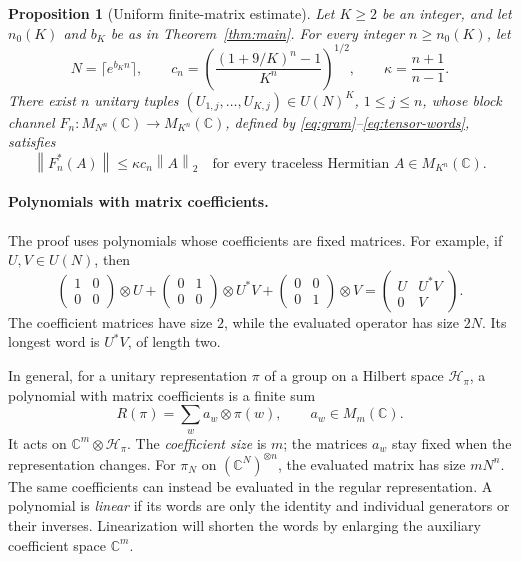 \documentclass[11pt]{article}
\numberwithin{equation}{section}
\newtheorem{proposition}[theorem]{Proposition}
\theoremstyle{boldremark}\newtheorem{remark}[theorem]{Remark}
\newcommand{\C}{\mathbb C}
\newcommand{\M}{M}
\newcommand{\norm}[1]{\left\lVert #1\right\rVert}
\begin{document}
\begin{proposition}[Uniform finite-matrix estimate]\label{prop:finite}
Let $K\ge2$ be an integer, and let $n_0(K)$ and $b_K$ be as in
Theorem~\ref{thm:main}.
For every integer $n\ge n_0(K)$, let
\[
 N=\lceil e^{b_Kn}\rceil,
 \qquad c_n=\left(\frac{(1+9/K)^n-1}{K^n}\right)^{1/2},
 \qquad \kappa=\frac{n+1}{n-1}.
\]
There exist $n$ unitary tuples
$(U_{1,j},\ldots,U_{K,j})\in U(N)^K$, $1\le j\le n$, whose block
channel $F_n:\M_{N^n}(\C)\to\M_{K^n}(\C)$, defined by
\eqref{eq:gram}--\eqref{eq:tensor-words}, satisfies
\begin{equation}
 \norm{F_n^*(A)}\le\kappa c_n\norm A_2
 \quad\text{for every traceless Hermitian }A\in\M_{K^n}(\C).
 \label{eq:finite}
\end{equation}
\end{proposition}

\paragraph{Polynomials with matrix coefficients.}
The proof uses polynomials whose coefficients are fixed matrices.
For example, if $U,V\in U(N)$, then
\[
 \begin{pmatrix}1&0\\0&0\end{pmatrix}\otimes U
 +\begin{pmatrix}0&1\\0&0\end{pmatrix}\otimes U^*V
 +\begin{pmatrix}0&0\\0&1\end{pmatrix}\otimes V
 =\begin{pmatrix}U&U^*V\\0&V\end{pmatrix}.
\]
The coefficient matrices have size $2$, while the evaluated operator
has size $2N$. Its longest word is $U^*V$, of length two.

In general, for a unitary representation $\pi$ of a group on a Hilbert
space $\mathcal H_\pi$, a polynomial with matrix coefficients is a finite sum
\[
 R(\pi)=\sum_w a_w\otimes\pi(w),\qquad a_w\in\M_m(\C).
\]
It acts on $\C^m\otimes\mathcal H_\pi$. The \emph{coefficient size}
is $m$; the matrices $a_w$ stay fixed when the representation changes.
For $\pi_N$ on $(\C^N)^{\otimes n}$, the evaluated matrix has size
$mN^n$. The same coefficients can instead be evaluated in the regular
representation. A polynomial is \emph{linear} if its words are only
the identity and individual generators or their inverses.
Linearization will shorten the words by enlarging the auxiliary
coefficient space $\C^m$.
\end{document}
